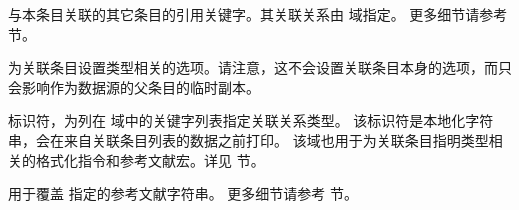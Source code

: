 \begin{fieldlist}



与本条目关联的其它条目的引用关键字。其关联关系由  域指定。
更多细节请参考  节。




为关联条目设置类型相关的选项。请注意，这不会设置关联条目本身的选项，而只会影响作为数据源的父条目的临时副本。



标识符，为列在  域中的关键字列表指定关联关系类型。
该标识符是本地化字符串，会在来自关联条目列表的数据之前打印。
该域也用于为关联条目指明类型相关的格式化指令和参考文献宏。详见  节。




用于覆盖  指定的参考文献字符串。
更多细节请参考  节。




\end{fieldlist}
